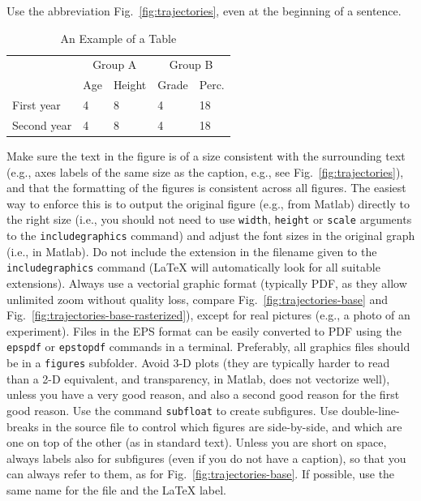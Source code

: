 \documentclass[letterpaper, 10 pt, conference]{ieeeconf}
\begin{document}
Use the abbreviation Fig.~\ref{fig:trajectories}, even at the beginning of a sentence.

\begin{table}[t]
\caption{An Example of a Table}
\label{table:example}
\centering
\begin{tabular}{lllll}
  \toprule
  &\multicolumn{2}{c}{Group A}
  &\multicolumn{2}{c}{Group B} \\
  \cmidrule(lr){2-3} \cmidrule(l){4-5}
  &Age
  &Height
  &Grade
  &Perc.\\
  \midrule
  First year & 4 & 8 & 4 & 18 \\
  Second year & 4 & 8 & 4 & 18 \\
  \bottomrule
\end{tabular}
\end{table}

Make sure the text in the figure is of a size consistent with the surrounding text (e.g., axes labels of the same size as the caption, e.g., see Fig.~\ref{fig:trajectories}), and that the formatting of the figures is consistent across all figures. The easiest way to enforce this is to output the original figure (e.g., from Matlab) directly to the right size (i.e., you should not need to use \verb|width|,  \verb|height| or \verb|scale| arguments to the \verb|includegraphics| command) and adjust the font sizes in the original graph (i.e., in Matlab). Do not include the extension in the filename given to the \verb|includegraphics| command  ({\LaTeX} will automatically look for all suitable extensions). Always use a vectorial graphic format (typically PDF, as they allow unlimited zoom without quality loss, compare Fig.~\ref{fig:trajectories-base} and Fig.~\ref{fig:trajectories-base-rasterized}), except for real pictures (e.g., a photo of an experiment). Files in the EPS format can be easily converted to PDF using the \verb|epspdf| or \verb|epstopdf| commands in a terminal. Preferably, all graphics files should be in a \verb|figures| subfolder. Avoid 3-D plots (they are typically harder to read than a 2-D equivalent, and transparency, in Matlab, does not vectorize well), unless you have a very good reason, and also a second good reason for the first good reason.
Use the command \verb|subfloat| to create subfigures. Use double-line-breaks in the source file to control which figures are side-by-side, and which are one on top of the other (as in standard text). Unless you are short on space, always labels also for subfigures (even if you do not have a caption), so that you can always refer to them, as for Fig.~\ref{fig:trajectories-base}. If possible, use the same name for the file and the \LaTeX{} label.
\end{document}
